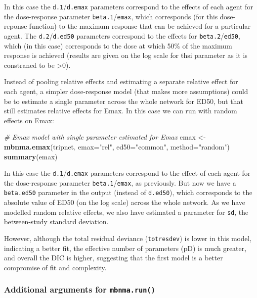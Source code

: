 \documentclass[]{article}
\newenvironment{Shaded}{\begin{snugshade}}{\end{snugshade}}
\newcommand{\CommentTok}[1]{\textcolor[rgb]{0.56,0.35,0.01}{\textit{#1}}}
\newcommand{\DataTypeTok}[1]{\textcolor[rgb]{0.13,0.29,0.53}{#1}}
\newcommand{\KeywordTok}[1]{\textcolor[rgb]{0.13,0.29,0.53}{\textbf{#1}}}
\newcommand{\NormalTok}[1]{#1}
\newcommand{\StringTok}[1]{\textcolor[rgb]{0.31,0.60,0.02}{#1}}
\begin{document}
In this case the \texttt{d.1}/\texttt{d.emax} parameters correspond to
the effects of each agent for the dose-response parameter
\texttt{beta.1}/\texttt{emax}, which corresponds (for this dose-reponse
function) to the maximum response that can be achieved for a particular
agent. The \texttt{d.2}/\texttt{d.ed50} parameters correspond to the
effects for \texttt{beta.2}/\texttt{ed50}, which (in this case)
corresponds to the dose at which 50\% of the maximum response is
achieved (results are given on the log scale for thsi parameter as it is
constraned to be \textgreater{}0).

Instead of pooling relative effects and estimating a separate relative
effect for each agent, a simpler dose-response model (that makes more
assumptions) could be to estimate a single parameter across the whole
network for ED50, but that still estimates relative effects for Emax. In
this case we can run with random effects on Emax:

\begin{Shaded}
\begin{Highlighting}[]
\CommentTok{# Emax model with single parameter estimated for Emax}
\NormalTok{emax <-}\StringTok{ }\KeywordTok{mbnma.emax}\NormalTok{(tripnet, }\DataTypeTok{emax=}\StringTok{"rel"}\NormalTok{, }\DataTypeTok{ed50=}\StringTok{"common"}\NormalTok{, }\DataTypeTok{method=}\StringTok{"random"}\NormalTok{)}
\KeywordTok{summary}\NormalTok{(emax)}
\end{Highlighting}
\end{Shaded}

In this case the \texttt{d.1}/\texttt{d.emax} parameters correspond to
the effect of each agent for the dose-response parameter
\texttt{beta.1}/\texttt{emax}, as previously. But now we have a
\texttt{beta.ed50} parameter in the output (instead of \texttt{d.ed50}),
which corresponds to the absolute value of ED50 (on the log scale)
across the whole network. As we have modelled random relative effects,
we also have estimated a parameter for \texttt{sd}, the between-study
standard deviation.

However, although the total residual deviance (\texttt{totresdev}) is
lower in this model, indicating a better fit, the effective number of
parameters (pD) is much greater, and overall the DIC is higher,
suggesting that the first model is a better compromise of fit and
complexity.

\hypertarget{additional-arguments-for-mbnma.run}{%
\subsubsection{\texorpdfstring{Additional arguments for
\texttt{mbnma.run()}}{Additional arguments for mbnma.run()}}\label{additional-arguments-for-mbnma.run}}
\end{document}
